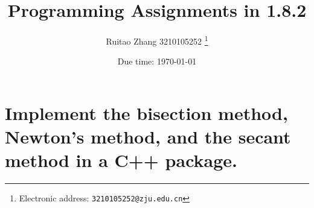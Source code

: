 \documentclass[a4paper]{article}
\begin{document}
\title{Programming Assignments in 1.8.2}

\author{Ruitao Zhang 3210105252
  \thanks{Electronic address: \texttt{3210105252@zju.edu.cn}}}


\date{Due time: \today}

\maketitle

\section{Implement the bisection method, Newton’s method, and the secant method in a C++ package.}
\end{document}
